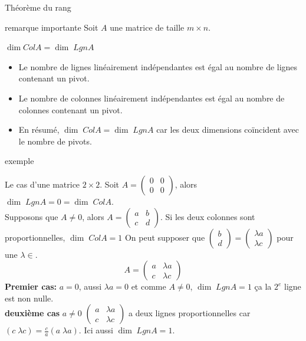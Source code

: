 
\begin{parag}{Théorème du rang}
    

\begin{subparag}{remarque importante}
Soit $A$ une matrice de taille $m \times n$.
\begin{theoreme}

    $\dim ColA = \dim\; LgnA$

\end{theoreme}
\begin{itemize}
    \item Le nombre de lignes linéairement indépendantes est égal au nombre de lignes contenant un pivot.
    \item Le nombre de colonnes linéairement indépendantes est égal au nombre de colonnes contenant un pivot.
    \item En résumé, $\dim\; ColA = \dim\; LgnA$ car les deux dimensions coïncident avec le nombre de pivots.

\end{itemize}
    
\end{subparag}


\begin{subparag}{exemple}

Le cas d'une matrice $2\times 2$.
Soit $A =  \begin{pmatrix}
    0 & 0 \\ 0 & 0
\end{pmatrix}$, alors $\dim\; LgnA = 0 = \dim \; ColA$.\\
Supposons que $A \neq 0$, alors $A = \begin{pmatrix}
    a & b \\ c & d
\end{pmatrix}$. Si les deux colonnes sont proportionnelles, $\dim\; ColA = 1$  On peut supposer que $\begin{pmatrix}
    b \\ d
\end{pmatrix} = \begin{pmatrix}
    \lambda a \\ \lambda c
\end{pmatrix}$ pour une $\lambda \in $\R. 
\[A = \begin{pmatrix}
    a & \lambda a \\ c & \lambda c
\end{pmatrix}\]
\textbf{Premier cas:} $a = 0$, aussi $\lambda a = 0$ et comme $A \neq 0$, $\dim \; LgnA = 1$ ça la $2^e$ ligne est non nulle.
\\
\textbf{deuxième cas} $a \neq 0$ $\begin{pmatrix}
    a & \lambda a \\ c & \lambda c
\end{pmatrix}  $ a deux lignes proportionnelles car $\left(c \; \lambda c\right) = \frac{c}{a}\left(a \; \lambda a\right)$. Ici aussi $\dim \; LgnA = 1$.
    
\end{subparag}

\end{parag}

